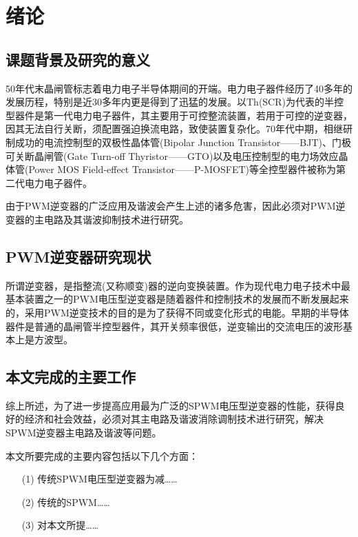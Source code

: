 
\section{绪\quad 论}
\subsection{课题背景及研究的意义}

\renewcommand{\baselinestretch}{1.5}
50年代末晶闸管标志着电力电子半导体期间的开端。电力电子器件经历了40多年的发展历程，特别是近30多年内更是得到了迅猛的发展。以Th(SCR)为代表的半控型器件是第一代电力电子器件，其主要用于可控整流装置，若用于可控的逆变器，因其无法自行关断，须配置强迫换流电路，致使装置复杂化。70年代中期，相继研制成功的电流控制型的双极性晶体管(Bipolar Junction Transistor——BJT)、门极可关断晶闸管(Gate Turn-off Thyristor——GTO)以及电压控制型的电力场效应晶体管(Power MOS Field-effect Transistor——P-MOSFET)等全控型器件被称为第二代电力电子器件。\par

由于PWM逆变器的广泛应用及谐波会产生上述的诸多危害，因此必须对PWM逆变器的主电路及其谐波抑制技术进行研究。\par


\subsection{PWM逆变器研究现状}

所谓逆变器，是指整流(又称顺变)器的逆向变换装置。作为现代电力电子技术中最基本装置之一的PWM电压型逆变器是随着器件和控制技术的发展而不断发展起来的，采用PWM逆变技术的目的是为了获得不同或变化形式的电能。早期的半导体器件是普通的晶闸管半控型器件，其开关频率很低，逆变输出的交流电压的波形基本上是方波型。

\subsection{本文完成的主要工作}
综上所述，为了进一步提高应用最为广泛的SPWM电压型逆变器的性能，获得良好的经济和社会效益，必须对其主电路及谐波消除调制技术进行研究，解决SPWM逆变器主电路及谐波等问题。\par
本文所要完成的主要内容包括以下几个方面：
\begin{itemize}[topsep=0pt,itemsep=0pt,parsep=0pt,leftmargin=1.5cm]
\item[(1)] 传统SPWM电压型逆变器为减……
\item[(2)] 传统的SPWM……
\item[(3)] 对本文所提……
\end{itemize}





